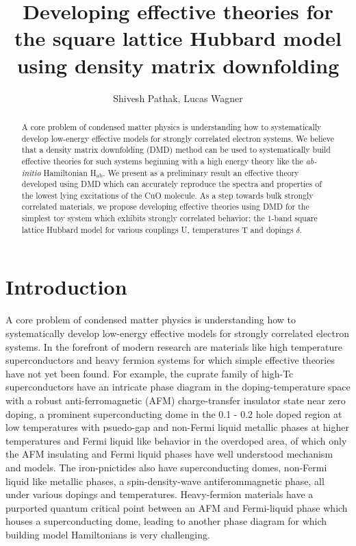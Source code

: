 \documentclass[12pt]{article}
\author{Shivesh Pathak, Lucas Wagner}
\title{Developing effective theories for the square lattice Hubbard model using density matrix downfolding}
\begin{document}
\maketitle
\begin{abstract}
A core problem of condensed matter physics is understanding how to systematically develop low-energy effective models for strongly correlated electron systems. 
We believe that a density matrix downfolding (DMD) method can be used to systematically build effective theories for such systems beginning with a high energy theory like the \textit{ab-initio} Hamiltonian H$_\text{ab}$.
We present as a preliminary result an effective theory developed using DMD which can accurately reproduce the spectra and properties of the lowest lying excitations of the CuO molecule.
As a step towards bulk strongly correlated materials, we propose developing effective theories using DMD for the simplest toy system which exhibits strongly correlated behavior: the 1-band square lattice Hubbard model for various couplings U, temperatures T and dopings $\delta$. 
\end{abstract}
\pagebreak

\section{Introduction}
A core problem of condensed matter physics is understanding how to systematically develop low-energy effective models for strongly correlated electron systems. 
In the forefront of modern research are materials like high temperature superconductors and heavy fermion systems for which simple effective theories have not yet been found. 
For example, the cuprate family of high-Tc superconductors have an intricate phase diagram in the doping-temperature space  with a robust anti-ferromagnetic (AFM) charge-transfer insulator state near zero doping, a prominent superconducting dome in the 0.1 - 0.2 hole doped region at low temperatures with psuedo-gap and non-Fermi liquid metallic phases at higher temperatures and Fermi liquid like behavior in the overdoped area, of which only the AFM insulating and Fermi liquid phases have well understood mechanism and models. 
The iron-pnictides also have superconducting domes, non-Fermi liquid like metallic phases, a spin-density-wave antiferommagnetic phase, all under various dopings and temperatures. 
Heavy-fermion materials have a purported quantum critical point between an AFM and Fermi-liquid phase which houses a superconducting dome, leading to another phase diagram for which building model Hamiltonians is very challenging. 
\end{document}
